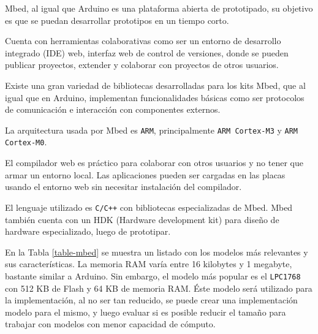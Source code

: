 
  Mbed, al igual que Arduino es una plataforma abierta de prototipado,
su objetivo es que se puedan desarrollar prototipos en un tiempo corto.

  Cuenta con herramientas colaborativas como ser un entorno de
  desarrollo integrado (IDE) web, interfaz web de control de versiones,
donde se pueden publicar proyectos, extender y colaborar con
proyectos de otros usuarios.

  Existe una gran variedad de bibliotecas desarrolladas para los
kits Mbed, que al igual que en Arduino, implementan funcionalidades
básicas como ser protocolos de comunicación e interacción con
componentes externos.

  La arquitectura usada por Mbed es \texttt{ARM}, principalmente
\texttt{ARM Cortex-M3} y \texttt{ARM Cortex-M0}.

  El compilador web es práctico para colaborar con otros
usuarios y no tener que armar un entorno local.
  Las aplicaciones pueden ser cargadas en las placas usando el
entorno web sin necesitar instalación del compilador.

  El lenguaje utilizado es \texttt{C/C++} con bibliotecas especializadas
de Mbed.
  Mbed también cuenta con un HDK (Hardware development kit) para diseño de
hardware especializado, luego de prototipar.

  En la Tabla \ref{table-mbed} se muestra un listado con los modelos
más relevantes y sus características.
  La memoria RAM varía entre 16 kilobytes y 1 megabyte, bastante similar
a Arduino. Sin embargo, el modelo más popular es el \texttt{LPC1768}
con 512 KB de Flash y 64 KB de memoria RAM.
  Éste modelo será utilizado para la implementación, al no ser tan
reducido, se puede crear una implementación modelo para el mismo, y luego
evaluar si es posible reducir el tamaño para trabajar con modelos
con menor capacidad de cómputo.

